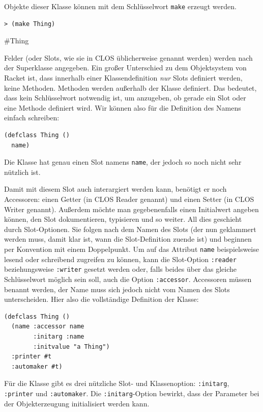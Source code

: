 Objekte dieser Klasse können mit dem Schlüsselwort \texttt{make} erzeugt werden.

\begin{lstlisting}
> (make Thing)
\end{lstlisting}
{\routput \#Thing}

Felder (oder Slots, wie sie in CLOS üblicherweise genannt werden) werden nach der Superklasse angegeben. Ein großer Unterschied zu dem Objektsystem von Racket ist, dass innerhalb einer Klassendefinition \textit{nur} Slots definiert werden, keine Methoden. Methoden werden außerhalb der Klasse definiert. Das bedeutet, dass kein Schlüsselwort notwendig ist, um anzugeben, ob gerade ein Slot oder eine Methode definiert wird. Wir können also für die Definition des Namens einfach schreiben:

\begin{lstlisting}
(defclass Thing ()
  name)
\end{lstlisting}

Die Klasse hat genau einen Slot namens \texttt{name}, der jedoch so noch nicht sehr nützlich ist.

Damit mit diesem Slot auch interargiert werden kann, benötigt er noch Accessoren: einen Getter (in CLOS Reader genannt) und einen Setter (in CLOS Writer genannt). Außerdem möchte man gegebenenfalls einen Initialwert angeben können, den Slot dokumentieren, typisieren und so weiter. All dies geschieht durch Slot-Optionen. Sie folgen nach dem Namen des Slots (der nun geklammert werden muss, damit klar ist, wann die Slot-Definition zuende ist) und beginnen per Konvention mit einem Doppelpunkt. Um auf das Attribut \texttt{name} beispielsweise lesend oder schreibend zugreifen zu können, kann die Slot-Option \texttt{:reader} beziehungsweise \texttt{:writer} gesetzt werden oder, falls beides über das gleiche Schlüsselwort möglich sein soll, auch die Option \texttt{:accessor}. Accessoren müssen benannt werden, der Name muss sich jedoch nicht vom Namen des Slots unterscheiden. Hier also die vollständige Definition der Klasse:

\begin{lstlisting}
(defclass Thing ()
  (name :accessor name
        :initarg :name
        :initvalue "a Thing")
  :printer #t
  :automaker #t)
\end{lstlisting}

Für die Klasse gibt es drei nützliche Slot- und Klassenoption: \texttt{:initarg}, \texttt{:printer} und \texttt{:automaker}. Die \texttt{:initarg}-Option bewirkt, dass der Parameter bei der Objekterzeugung initialisiert werden kann.


